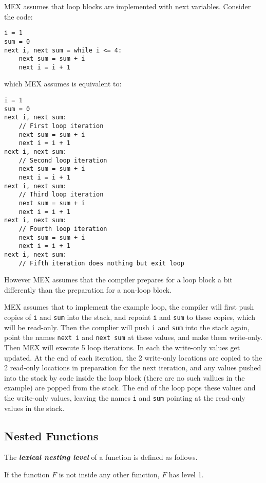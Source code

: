 \documentclass[12pt]{article}
\newcommand{\key}[1]{{\bf \em #1}\index{#1}}
\newenvironment{indpar}[1][0.3in]%
	{\begin{list}{}%
		     {\setlength{\itemsep}{0in}%
		      \setlength{\topsep}{0in}%
		      \setlength{\parsep}{1ex}%
		      \setlength{\labelwidth}{#1}%
		      \setlength{\leftmargin}{#1}%
		      \addtolength{\leftmargin}{\labelsep}}%
	 \item}%
	{\end{list}}
\begin{document}
MEX assumes that loop blocks are implemented with next variables.
Consider the code:
\begin{indpar}\label{EXAMPLE-LOOP}\begin{verbatim}
i = 1
sum = 0
next i, next sum = while i <= 4:
    next sum = sum + i
    next i = i + 1
\end{verbatim}\end{indpar}
which MEX assumes is equivalent to:
\begin{indpar}\begin{verbatim}
i = 1
sum = 0
next i, next sum:
    // First loop iteration
    next sum = sum + i
    next i = i + 1
next i, next sum:
    // Second loop iteration
    next sum = sum + i
    next i = i + 1
next i, next sum:
    // Third loop iteration
    next sum = sum + i
    next i = i + 1
next i, next sum:
    // Fourth loop iteration
    next sum = sum + i
    next i = i + 1
next i, next sum:
    // Fifth iteration does nothing but exit loop
\end{verbatim}\end{indpar}
However MEX assumes that the compiler prepares for a loop
block a bit differently than the preparation for
a non-loop block.

MEX assumes that to implement the example loop, the compiler
will first push copies of {\tt i} and {\tt sum} into
the stack, and repoint {\tt i} and {\tt sum} to these
copies, which will be read-only.
Then the complier will push {\tt i} and {\tt sum}
into the stack again, point the names {\tt next i} and
{\tt next sum} at these values, and make them write-only.
Then MEX will execute 5 loop iterations.  In each the
write-only values get updated.  At the end of each
iteration, the 2 write-only locations are copied to the
2 read-only locations in preparation for the next
iteration, and any values pushed into the stack by
code inside the loop block (there are no such vallues
in the example) are popped from the stack.  The end of
the loop pops these values and the write-only values,
leaving the names {\tt i} and {\tt sum} pointing at the read-only values
in the stack.

\subsection{Nested Functions}
\label{NESTED-FUNCTIONS}

The \key{lexical nesting level}\label{LEXICAL-NESTING-LEVEL}
of a function is defined as follows.

If the function $F$ is not inside any other function, $F$ has
level 1.
\end{document}
